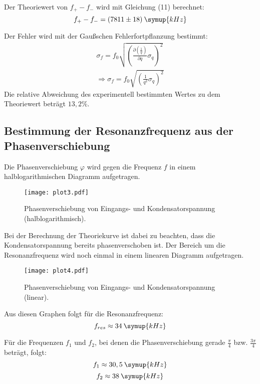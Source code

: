 Der Theoriewert von $f_+ - f_-$ wird mit Gleichung (11) berechnet:
\begin{equation*}
  f_+ - f_- = (7811 \pm 18) \:\symup{kHz}
\end{equation*}

Der Fehler wird mit der Gaußschen Fehlerfortpflanzung bestimmt:
\begin{align*}
  \sigma_f = f_0 \sqrt{
      \left(\frac{\partial \left(\frac{1}{q}\right)}{\partial q} \sigma_{q} \right)^{\!\! 2}
      } \\
      \Rightarrow \sigma_f = f_0 \sqrt{\left(\frac{1}{q^2} \sigma_q \right)^2}
\end{align*}
Die relative Abweichung des experimentell bestimmten Wertes zu dem Theoriewert beträgt $13,2 \%$.


\subsection{Bestimmung der Resonanzfrequenz aus der Phasenverschiebung}

Die Phasenverschiebung $\varphi$ wird gegen die Frequenz $f$ in einem halblogarithmischen
Diagramm aufgetragen.

\begin{figure}[H]
  \centering
  \texttt{[image: plot3.pdf]}
  \caption{Phasenverschiebung von Eingangs- und Kondensatorspannung (halblogarithmisch).}
  \label{fig:plot3}
\end{figure}



Bei der Berechnung der Theoriekurve ist dabei zu beachten, dass die Kondensatorspannung
bereits phasenverschoben ist.
Der Bereich um die Resonanzfrequenz wird noch einmal in einem linearen Diagramm aufgetragen.

\begin{figure}[H]
  \centering
  \texttt{[image: plot4.pdf]}
  \caption{Phasenverschiebung von Eingangs- und Kondensatorspannung (linear).}
  \label{fig:plot4}
\end{figure}

Aus diesen Graphen folgt für die Resonanzfrequenz:
\begin{equation*}
  f_{res} \approx 34 \:\symup{kHz}
\end{equation*}

Für die Frequenzen $f_1$ und $f_2$, bei denen die Phasenverschiebung gerade
$\frac{\pi}{4}$ bzw. $\frac{3\pi}{4}$ beträgt, folgt:
\begin{equation*}
  f_1 \approx 30,5 \:\symup{kHz}
\end{equation*}
\begin{equation*}
  f_2 \approx 38 \:\symup{kHz}
\end{equation*}

